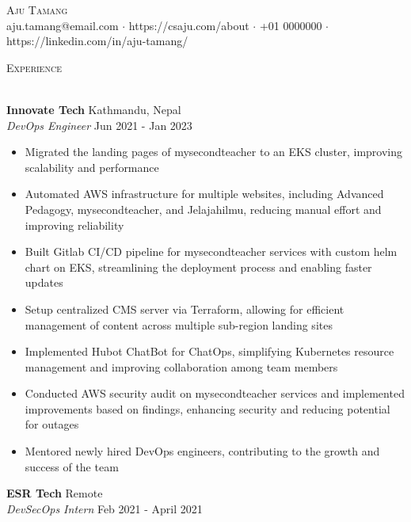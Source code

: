 \documentclass[a4paper]{article}
\newcommand{\lineunder} {
    \vspace*{-8pt} \\
    \hspace*{-18pt} \hrulefill \\
}
\newcommand{\header} [1] {
    {\hspace*{-18pt}\vspace*{6pt} \textsc{#1}}
    \vspace*{-6pt} \lineunder
}
\begin{document}
\vspace*{-40pt}

    

\vspace*{-10pt}
\begin{center}
	{\Huge \scshape {Aju Tamang}}\\
	aju.tamang@email.com $\cdot$ https://csaju.com/about $\cdot$ +01 0000000 $\cdot$ https://linkedin.com/in/aju-tamang/\\
\end{center}



\header{Experience}
\vspace{1mm}

\textbf{Innovate Tech} \hfill Kathmandu, Nepal\\
\textit{DevOps Engineer} \hfill Jun 2021 - Jan 2023\\
\vspace{-1mm}
\begin{itemize} \itemsep 1pt
	\item Migrated the landing pages of mysecondteacher to an EKS cluster, improving scalability and performance
	\item Automated AWS infrastructure for multiple websites, including Advanced Pedagogy, mysecondteacher, and Jelajahilmu, reducing manual effort and improving reliability
	\item Built Gitlab CI/CD pipeline for mysecondteacher services with custom helm chart on EKS, streamlining the deployment process and enabling faster updates
	\item Setup centralized CMS server via Terraform, allowing for efficient management of content across multiple sub-region landing sites
	\item Implemented Hubot ChatBot for ChatOps, simplifying Kubernetes resource management and improving collaboration among team members
	\item Conducted AWS security audit on mysecondteacher services and implemented improvements based on findings, enhancing security and reducing potential for outages
	\item Mentored newly hired DevOps engineers, contributing to the growth and success of the team
\end{itemize}
\textbf{ESR Tech} \hfill Remote\\
\textit{DevSecOps Intern} \hfill Feb 2021 - April 2021\\
\vspace{-1mm}
\end{document}
